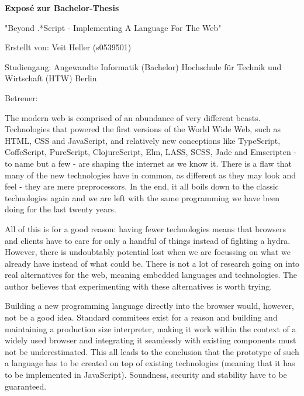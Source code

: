 \documentclass[oneside,11pt,xetex]{scrbook}
\begin{document}
\renewcommand{\thepage}{\roman{page}}

\pagestyle{empty}

\frontmatter

\vspace*{0.4\textheight}

\begin{flushleft}
\Large{\textbf{Exposé zur Bachelor-Thesis}}
\vspace{0.5cm}

\large{"Beyond .*Script - Implementing A Language For The Web"}
\vspace{0.5cm}

Erstellt von: Veit Heller (s0539501)
\vspace{0.1cm}

Studiengang:  Angewandte Informatik (Bachelor)\linebreak
Hochschule für Technik und Wirtschaft (HTW) Berlin
\vspace{0.1cm}

Betreuer:
\end{flushleft}

\date{\today}


The modern web is comprised of an abundance of very different beasts. Technologies that powered the first versions of the World Wide Web, such as HTML, CSS and JavaScript, and relatively new conceptions like TypeScript, CoffeScript, PureScript, ClojureScript, Elm, LASS, SCSS, Jade and Emscripten - to name but a few - are shaping the internet as we know it. There is a flaw that many of the new technologies have in common, as different as they may look and feel - they are mere preprocessors. In the end, it all boils down to the classic technologies again and we are left with the same programming we have been doing for the last twenty years.
\vspace{0.3cm}

All of this is for a good reason: having fewer technologies means that browsers and clients have to care for only a handful of things instead of fighting a hydra. However, there is undoubtably potential lost when we are focussing on what we already have instead of what could be. There is not a lot of research going on into real alternatives for the web, meaning embedded languages and technologies. The author believes that experimenting with these alternatives is worth trying.
\vspace{0.3cm}

Building a new programming language directly into the browser would, however, not be a good idea. Standard commitees exist for a reason and building and maintaining a production size interpreter, making it work within the context of a widely used browser and integrating it seamlessly with existing components must not be underestimated. This all leads to the conclusion that the prototype of such a language has to be created on top of existing technologies (meaning that it has to be implemented in JavaScript). Soundness, security and stability have to be guaranteed.
\end{document}
